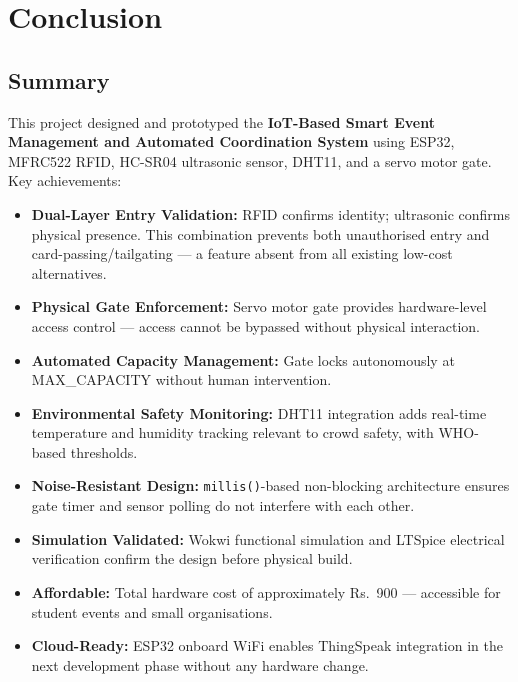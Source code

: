 \documentclass[12pt,a4paper]{report}
\begin{document}
{%
\chapter{Conclusion}

\section{Summary}

This project designed and prototyped the \textbf{IoT-Based Smart Event Management and Automated Coordination System} using ESP32, MFRC522 RFID, HC-SR04 ultrasonic sensor, DHT11, and a servo motor gate. Key achievements:

\begin{itemize}[leftmargin=*]
    \item \textbf{Dual-Layer Entry Validation:} RFID confirms identity; ultrasonic confirms physical presence. This combination prevents both unauthorised entry and card-passing/tailgating --- a feature absent from all existing low-cost alternatives.
    \item \textbf{Physical Gate Enforcement:} Servo motor gate provides hardware-level access control --- access cannot be bypassed without physical interaction.
    \item \textbf{Automated Capacity Management:} Gate locks autonomously at MAX\_CAPACITY without human intervention.
    \item \textbf{Environmental Safety Monitoring:} DHT11 integration adds real-time temperature and humidity tracking relevant to crowd safety, with WHO-based thresholds.
    \item \textbf{Noise-Resistant Design:} \texttt{millis()}-based non-blocking architecture ensures gate timer and sensor polling do not interfere with each other.
    \item \textbf{Simulation Validated:} Wokwi functional simulation and LTSpice electrical verification confirm the design before physical build.
    \item \textbf{Affordable:} Total hardware cost of approximately Rs.~900 --- accessible for student events and small organisations.
    \item \textbf{Cloud-Ready:} ESP32 onboard WiFi enables ThingSpeak integration in the next development phase without any hardware change.
\end{itemize}

}
\end{document}
